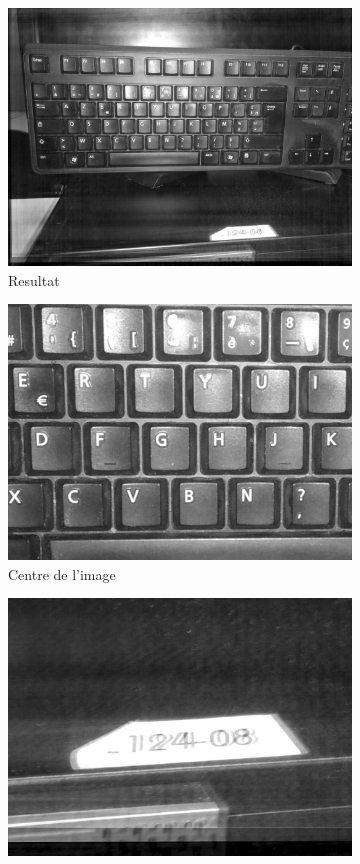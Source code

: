 \documentclass[a4paper,10pt]{report}
\begin{document}
\begin{figure}[h]

\begin{subfigure}{0.32\textwidth}
\includegraphics[width=0.9\linewidth]{ressource/flou_rot_10kit.jpg} 
\caption{Resultat}
\label{fig:flourot}
\end{subfigure}
\begin{subfigure}{0.32\textwidth}
\includegraphics[width=0.9\linewidth]{ressource/flou_rot_centre.png} 
\caption{Centre de l'image}
\label{fig:flouRotCenter}
\end{subfigure}
\begin{subfigure}{0.32\textwidth}
\includegraphics[width=0.9\linewidth]{ressource/flou_rot_bottom.png} 

\end{subfigure}
\end{figure}
\end{document}
